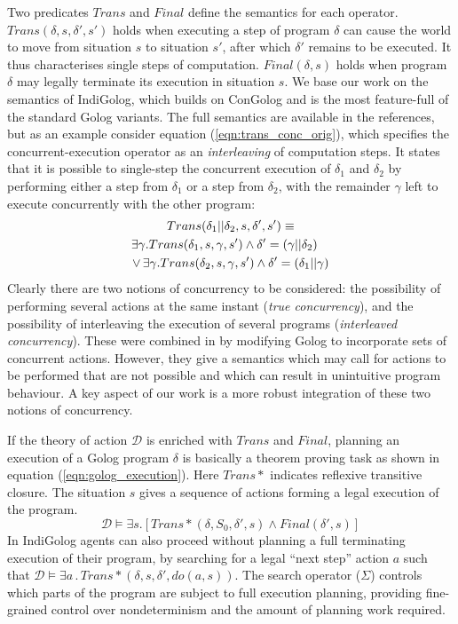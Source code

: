 Two predicates $Trans$ and $Final$ define the semantics for each
operator. $Trans(\delta,s,\delta',s')$ holds when executing a step
of program $\delta$ can cause the world to move from situation $s$
to situation $s'$, after which $\delta'$ remains to be executed.
It thus characterises single steps of computation. $Final(\delta,s)$
holds when program $\delta$ may legally terminate its execution in
situation $s$. We base our work on the semantics of IndiGolog, which
builds on ConGolog and is the most feature-full of the standard Golog
variants. The full semantics are available in the references, but
as an example consider equation (\ref{eqn:trans_conc_orig}), which
specifies the concurrent-execution operator as an \emph{interleaving}
of computation steps. It states that it is possible to single-step
the concurrent execution of $\delta_{1}$ and $\delta_{2}$ by performing
either a step from $\delta_{1}$ or a step from $\delta_{2}$, with
the remainder $\gamma$ left to execute concurrently with the other
program:\begin{multline}
Trans(\delta_{1}||\delta_{2},s,\delta',s')\equiv\\
\shoveright{\exists\gamma.Trans(\delta_{1},s,\gamma,s')\wedge\delta'=(\gamma||\delta_{2})}\\
\vee\,\exists\gamma.Trans(\delta_{2},s,\gamma,s')\wedge\delta'=(\delta_{1}||\gamma)\label{eqn:Background:trans_conc_orig}\end{multline}
 Clearly there are two notions of concurrency to be considered: the
possibility of performing several actions at the same instant (\emph{true
concurrency}), and the possibility of interleaving the execution of
several programs (\emph{interleaved concurrency}). These were combined
in \citet{pinto99tcongolog} by modifying Golog to incorporate sets
of concurrent actions. However, they give a semantics which may call
for actions to be performed that are not possible and which can result
in unintuitive program behaviour. A key aspect of our work is a more
robust integration of these two notions of concurrency.

If the theory of action $\mathcal{D}$ is enriched with $Trans$ and
$Final$, planning an execution of a Golog program $\delta$ is basically
a theorem proving task as shown in equation (\ref{eqn:golog_execution}).
Here $Trans*$ indicates reflexive transitive closure. The situation
$s$ gives a sequence of actions forming a legal execution of the
program.\begin{equation}
\mathcal{D}\models\exists s.\left[Trans*(\delta,S_{0},\delta',s)\wedge Final(\delta',s)\right]\label{eqn:Background:golog_execution}\end{equation}
 In IndiGolog agents can also proceed without planning a full terminating
execution of their program, by searching for a legal {}``next step''
action $a$ such that $\mathcal{D}\models\exists a\,.\, Trans*(\delta,s,\delta',do(a,s))$.
The search operator ($\Sigma$) controls which parts of the program
are subject to full execution planning, providing fine-grained control
over nondeterminism and the amount of planning work required.

